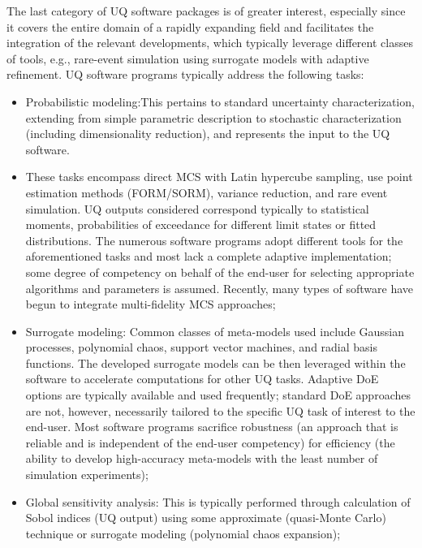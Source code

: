 The last category of UQ software packages is of greater interest, especially since it covers the entire domain of a rapidly expanding field and facilitates the integration of the relevant developments, which typically leverage different classes of tools, e.g., rare-event simulation using surrogate models with adaptive refinement. UQ software programs typically address the following tasks:

\begin{itemize}

    \item{Probabilistic modeling:}This pertains to standard uncertainty characterization, extending from simple parametric description to stochastic characterization (including dimensionality reduction), and represents the input to the UQ software.
    \vspace{2mm}
    \item These tasks encompass direct MCS with Latin hypercube sampling, use point estimation methods (FORM/SORM),  variance reduction, and rare event simulation. UQ outputs considered correspond typically to statistical moments, probabilities of exceedance for different limit states or fitted distributions. The numerous software programs adopt different tools for the aforementioned tasks and most lack a complete adaptive implementation; some degree of competency on behalf of the end-user for selecting appropriate algorithms and parameters is assumed. Recently, many types of software have begun to integrate multi-fidelity MCS approaches;
     \vspace{2mm}   
    \item{Surrogate modeling:} Common classes of meta-models used include Gaussian processes, polynomial chaos, support vector machines, and radial basis functions. The developed surrogate models can be then leveraged within the software to accelerate computations for other UQ tasks. Adaptive DoE options are typically available and used frequently; standard DoE approaches are not, however, necessarily tailored to the specific UQ task of interest to the end-user. Most software programs sacrifice robustness (an approach that is reliable and is independent of the end-user competency) for efficiency (the ability to develop high-accuracy meta-models with the least number of simulation experiments);
    \vspace{2mm}    
    \item {Global sensitivity analysis:} This is typically performed through calculation of Sobol indices (UQ output) using some approximate (quasi-Monte Carlo) technique or surrogate modeling (polynomial chaos expansion);

\end{itemize}

